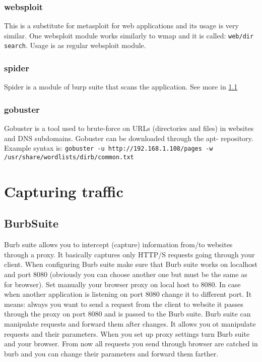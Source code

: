 \documentclass{article}[12pt]
\newcommand{\q}[1]{\texttt{#1}}
\begin{document}
\subsubsection{websploit}

This is a substitute for metasploit for web applications and its usage is very similar.
One websploit module works similarly to wmap and it is called: \texttt{web/dir search}.
Usage is as regular websploit module.


\subsubsection{spider}
Spider is a module of burp suite that scans the application.
See more in \ref{subsec:burp}

\subsubsection{gobuster}
Gobuster is a tool used to brute-force on URLs (directories and files) in websites and DNS subdomains.
Gobuster can be downloaded through the apt- repository.
Example syntax is: \newline
\q{gobuster -u http://192.168.1.108/pages -w /usr/share/wordlists/dirb/common.txt}








%
%

\section{Capturing traffic}
\label{sec:traffic}

\subsection{BurbSuite}
\label{subsec:burp}

Burb suite allows you to intercept (capture) information from/to websites through a proxy.
It basically captures only HTTP/S requests going through your client.
When configuring Burb suite make sure that Burb suite works on localhost and port 8080 (obviously you can choose another one but must be the same as for browser).
Set manually your browser proxy on local host to 8080.
In case when another application is listening on port 8080 change it to different port.
It means: always you want to send a request from the client to website it passes through the proxy on port 8080 and is passed to the Burb suite.
Burb suite can manipulate requests and forward them after changes.
It allows you ot manipulate requests and their parameters.
When you set up proxy settings turn Burb suite and your browser.
From now all requests you send through browser are catched in burb and you can change their parameters and forward them farther.
\end{document}
